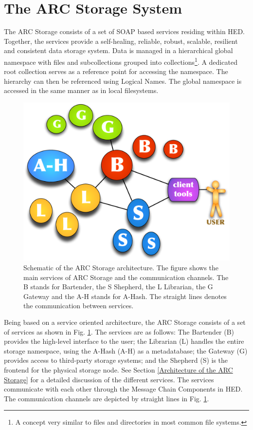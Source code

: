 \documentclass[final]{ieee}
\begin{document}
\section{The ARC Storage System}
\label{The ARC Storage System}

The ARC Storage consists of a set of SOAP based services residing
within HED. Together, the services provide a self-healing, reliable, robust,
scalable, resilient and consistent data storage system. Data is
managed in a hierarchical global namespace with files and
subcollections grouped into collections\footnote{A concept very
  similar to files and directories in most common file systems.}.  A
dedicated root collection serves as a reference point for accessing the namespace. The hierarchy can then be
referenced using Logical Names. The global namespace is accessed
in the same manner as in local filesystems.

\begin{figure}
  \begin{center}
    \includegraphics[width=0.8\columnwidth]{arc1-storage-services-with-gateway.pdf}
  \end{center}
  \caption{Schematic of the ARC Storage architecture. The figure shows
    the main services of ARC Storage and the communication channels. The B stands for Bartender, the S Shepherd, the L Librarian, the G Gateway and the A-H stands for A-Hash. The straight lines denotes the communication between services.}
  \label{fig:arc1_storage_service}
\end{figure}

Being based on a service oriented architecture, the ARC
Storage consists of a set of services as shown in Fig.
\ref{fig:arc1_storage_service}. The services are as follows: The Bartender (B)
provides the high-level interface to the user; the Librarian (L)
handles the entire storage namespace, using the A-Hash (A-H) as a metadatabase; the
Gateway (G) provides access to third-party storage systems; and
the Shepherd (S) is the frontend for the physical storage node. 
See Section \ref{Architecture of the ARC Storage} for a detailed
discussion of the different services.   
The services communicate with each other through the
Message Chain Components in HED. The communication channels are
depicted by straight lines in Fig. \ref{fig:arc1_storage_service}.
\end{document}
